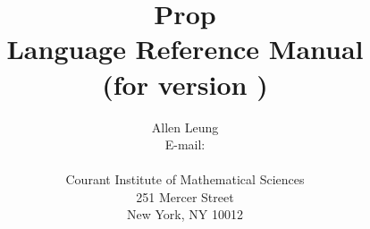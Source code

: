\newcommand{\CLASSDEF}[1]{\T{#1}\index{Classes!{\codefont #1}}}
\newcommand{\INDEX}[1]{\index{#1}}
\newcommand{\NDEF}[1]{\N{#1}\index{Syntax!Non--terminals!{\nontermfont #1}}}
\newcommand{\OPTIONDEF}[1]{{\tt #1}\index{Command line options!{\tt #1}}}
\newcommand{\TDEF}[1]{\T{#1}\index{Syntax!Keywords!{\codefont #1}}}
\newcommand{\INCOMPLETE}{{\em This section is incomplete.}}
\newenvironment{Error}{\begin{center}\begin{tabular}{p{3in}p{3in}}
  \bf Error & \bf Explanation}{\\\hline\end{tabular}\end{center}}
\newcommand{\errormsg}[1]{\\\hline {\tt #1}&}
\newenvironment{Tips}{\noindent {\bf Tips:} \quad}{}

\newcommand{\support}{
   {\small\noindent This work is supported in part by
    an award from Hewlett-Packard Corporation, from IBM corporation, and
    an NYU Research Challenge Grant.
   }}
\newcommand{\warning}{
   {\small\noindent The author will neither assume responsibility for any
   damages caused by the use of this product, nor accept warranty or update
   claims.  This product is distributed in the hope that it will be useful,
   but WITHOUT ANY WARRANTY; without even the implied warranty of
   MERCHANTABILITY or FITNESS FOR A PARTICULAR PURPOSE.

   \small\noindent This product is in the public domain,
   and may be freely distributed.

   \small\noindent {\sf Prop} is a research prototype. 
    The information contained in this document is subject
    to change without notice.
   }}

   \makeindex

%
%
\documentclass{article}
\usepackage{html}

   \pagestyle{myheadings}

   \title{{\Huge \bf Prop \\ 
           Language Reference Manual} \\ 
          {\large \bf (for version \Version)}
         } 
   \author{{\Large Allen Leung} \\ 
           E-mail: \email \\
	   \\
           Courant Institute of Mathematical Sciences \\
           251 Mercer Street \\
           New York, NY 10012 \\
          }

